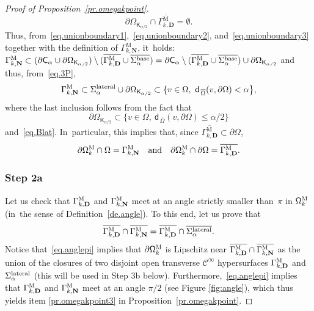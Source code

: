 \documentclass[JEP,XML,SOM,Unicode,NoEqCountersInSection,NoFloatCountersInSection,published]{cedram}
\newcommand{\quand}{\quad\text{and}\quad}
\newcommand{\mbf}[1]{\mathbf{#1}}
\let\pa\partial
\theoremstyle{plain}
\theoremstyle{definition}
\begin{document}
\begin{proof}[Proof of Proposition~\ref{pr.omegakpoint}]
\begin{equation}
\partial \Omega_{\mathsf K_{\alpha/2}}\cap \overline{\Gamma_{k,\mbf D}^{\text{M}}}=\emptyset.
\end{equation}
Thus, from~\eqref{eq.unionboundary1},~\eqref{eq.unionboundary2}, and~\eqref{eq.unionboundary3} together with the definition of $\Gamma_{k,\mbf N}^{\text{M}}$, it~holds: $\Gamma_{k,\mbf N}^{\text{M}} \subset (\pa \mathsf C_\alpha \cup \partial \Omega_{\mathsf K_{\alpha/2}})\setminus (\overline{\Gamma_{k,\mbf D}^{\text{M}}}\cup \overline{ \Sigma_\alpha^{\textup{base}}}) = \pa \mathsf C_\alpha \setminus (\overline{\Gamma_{k,\mbf D}^{\text{M}}}\cup \overline{ \Sigma_\alpha^{\textup{base}}}) \cup \partial \Omega_{\mathsf K_{\alpha/2}}$ and thus, from~\eqref{eq.3P},
\begin{equation}\label{eq.GK2}
\Gamma_{k,\mbf N}^{\text{M}} \subset \Sigma_\alpha^{\textup{lateral}} \cup \partial \Omega_{\mathsf K_{\alpha/2}} \subset \{v\in \Omega, \ \mathsf d_{\, \overline \Omega}(v,\partial \Omega)< {\alpha} \big \},
\end{equation}
where the last inclusion follows from the fact that
\[
\partial \Omega_{\mathsf K_{\alpha/2}}\subset \{v\in \Omega, \ \mathsf d_{\, \overline \Omega}(v,\partial \Omega)\le \alpha / {2}\big \}
\]
and~\eqref{eq.Blat}. In~particular, this implies that, since $\overline{\Gamma_{k,\mbf D}^{\text{M}}}\subset \partial \Omega$,
\begin{equation}\label{eq.onm}
\pa \mathsf \Omega_k^{\textsc{M}} \cap \Omega =\Gamma_{k,\mbf N}^{\text{M}} \quand \pa \mathsf \Omega_k^{\textsc{M}} \cap \partial \Omega = \overline{\Gamma_{k,\mbf D}^{\text{M}}}.
\end{equation}


\subsubsection*{Step 2a} Let us check that $\Gamma_{k,\mbf
D}^{\textsc{M}} $ and $\Gamma_{k,\mbf N}^{\textsc{M}}$ meet
at an angle strictly smaller than~$\pi$ in $\mathsf
\Omega_k^{\textsc{M}}$ (in~the sense of Definition~\ref{de.angle}). To this end, let us prove that
\begin{equation}\label{eq.anglepi}
\overline{\Gamma_{k,\mbf D}^{\textsc{M}} }\cap \overline{\Gamma_{k,\mbf N}^{\textsc{M}}}=\overline{\Gamma_{k,\mbf D}^{\textsc{M}} }\cap \overline{\Sigma_\alpha^{\textup{lateral}}}.
\end{equation}
Notice that~\eqref{eq.anglepi} implies that $\pa \mathsf
\Omega_k^{\textsc{M}}$ is Lipschitz near
$\overline{\Gamma_{k,\mbf D}^{\textsc{M}} }\cap
\overline{\Gamma_{k,\mbf N}^{\textsc{M}}}$ as the union of
the closures of two disjoint open transverse $\mathcal
C^\infty$ hypersurfaces $\Gamma_{k,\mbf D}^{\textsc{M}}$ and
$\Sigma_\alpha^{\textup{lateral}}$ (this will be used in Step 3b below). Furthermore,~\eqref{eq.anglepi}
implies that $\Gamma_{k,\mbf D}^{\textsc{M}} $ and
$\Gamma_{k,\mbf N}^{\textsc{M}}$ meet at an angle $\pi/2$
(see Figure \ref{fig:angle}), which thus yields item \eqref{pr.omegakpoint3} in Proposition~\ref{pr.omegakpoint}.


\end{proof}
\end{document}
